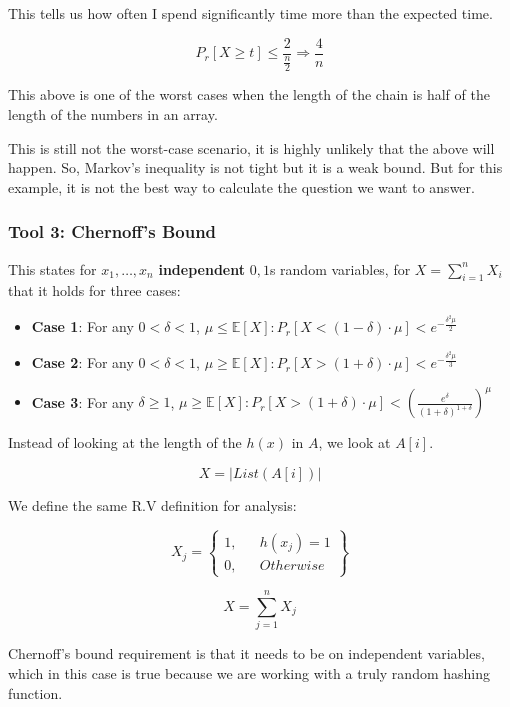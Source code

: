 \documentclass{article}
\begin{document}
This tells us how often I spend significantly time more than the expected time. 

$$
P_r[X \geq t] \leq  \frac{2}{\frac{n}{2}} \Rightarrow \frac{4}{n}
$$

This above is one of the worst cases when the length of the chain is half of the length of the numbers in an array.

This is still not the worst-case scenario, it is highly unlikely that the above will happen. So, Markov's inequality is not tight but it is a weak bound. But for this example, it is not the best way to calculate the question we want to answer.

\subsubsection{Tool 3: Chernoff's Bound}

This states for $x_1, \ldots, x_n$ \textbf{independent} $0, 1$s random variables, for $X = \sum^{n}_{i=1} X_i$ that it holds for three cases:

\begin{itemize}
    \item \textbf{Case 1}: For any $0 < \delta < 1$, $\mu \leq \mathbb E[X]: P_r[X < (1-\delta) \cdot \mu] < e^{-\frac{\delta^2\mu}{2}}$
    \item \textbf{Case 2}: For any $0 < \delta < 1$, $\mu \geq \mathbb E[X]: P_r[X > (1+\delta) \cdot \mu] < e^{-\frac{\delta^2\mu}{3}}$
    \item \textbf{Case 3}: For any $\delta \geq 1$, $\mu \geq \mathbb E[X]: P_r[X > (1+\delta) \cdot \mu] < (\frac{e^{\delta}}{(1+\delta)^{1+\delta}})^{\mu}$
\end{itemize}

Instead of looking at the length of the $h(x)$ in $A$, we look at $A[i]$.

$$
X = |List(A[i])|
$$

We define the same R.V definition for analysis:

$$
X_j = \left\{\begin{matrix}
    1, && h(x_j) = 1 \\
    0, && Otherwise
\end{matrix}\right\}
$$

$$
X = \sum^{n}_{j=1} X_j
$$

Chernoff's bound requirement is that it needs to be on independent variables, which in this case is true because we are working with a truly random hashing function.
\end{document}
